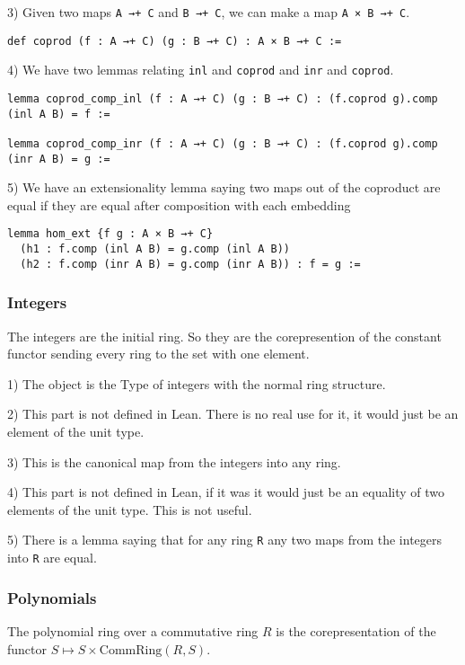 \documentclass[12pt]{article} %
\theoremstyle{definition}
\theoremstyle{definition}
\theoremstyle{definition}
\theoremstyle{definition}
\begin{document}
3) Given two maps \lstinline{A →+ C} and \lstinline{B →+ C}, we can make a map
\lstinline{A × B →+ C}.
\begin{lstlisting}
def coprod (f : A →+ C) (g : B →+ C) : A × B →+ C :=
\end{lstlisting}

4) We have two lemmas relating \lstinline{inl} and \lstinline{coprod} and \lstinline{inr}
and \lstinline{coprod}.
\begin{lstlisting}
lemma coprod_comp_inl (f : A →+ C) (g : B →+ C) : (f.coprod g).comp (inl A B) = f :=

lemma coprod_comp_inr (f : A →+ C) (g : B →+ C) : (f.coprod g).comp (inr A B) = g :=
\end{lstlisting}

5) We have an extensionality lemma saying two maps out of the coproduct are equal 
if they are equal after composition with each embedding
\begin{lstlisting}
lemma hom_ext {f g : A × B →+ C}
  (h1 : f.comp (inl A B) = g.comp (inl A B)) 
  (h2 : f.comp (inr A B) = g.comp (inr A B)) : f = g :=
\end{lstlisting}

\subsubsection{Integers}
The integers are the initial ring. So they are the corepresention of the 
constant functor sending every ring to the set with one element.

1) The object is the Type of integers with the normal ring structure.

2) This part is not defined in Lean. There is no real use for it, it would just be an element of 
the unit type.

3) This is the canonical map from the integers into any ring.

4) This part is not defined in Lean, if it was it would just be an equality of two 
elements of the unit type. This is not useful.

5) There is a lemma saying that for any ring \lstinline{R} any two maps from the integers into \lstinline{R}
are equal.

\subsubsection{Polynomials}
The polynomial ring over a commutative ring $R$ is the corepresentation of the functor 
$S \mapsto S \times \text{CommRing}(R, S)$.
\end{document}

